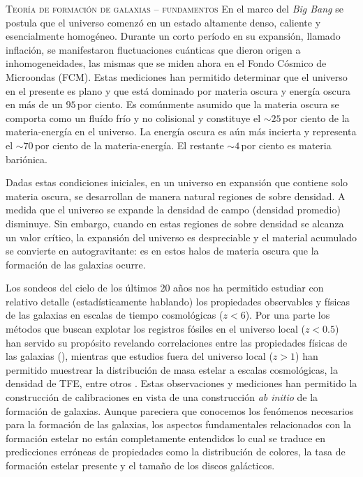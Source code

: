 \documentclass[xcolor=dvipsnames,4pt,hyperref={colorlinks,citecolor=black,linkcolor=black,urlcolor=black}]{beamer}
\begin{document}
\begin{frame}[allowframebreaks]{\textsc{Teoría de formación de galaxias -- fundamentos}}
%
En el marco del \emph{Big Bang} se postula que el universo comenzó en un estado altamente denso,
caliente y esencialmente homogéneo. Durante un corto período en su expansión, llamado inflación, se
manifestaron fluctuaciones cuánticas que dieron origen a inhomogeneidades, las mismas que se miden
ahora en el Fondo Cósmico de Microondas (FCM).
Estas mediciones han permitido determinar que el universo en el presente es plano y que está
dominado por materia oscura y energía oscura en más de un $95\,$por ciento. Es comúnmente asumido
que la materia oscura se comporta como un fluído frío y no colisional y constituye el $\sim25\,$por
ciento de la materia-energía en el universo.
La energía oscura es aún más incierta y representa el $\sim70\,$por ciento de la materia-energía. El
restante $\sim4\,$por ciento es materia bariónica.

Dadas estas condiciones iniciales, en un universo en expansión que contiene solo materia oscura, se
desarrollan de manera natural regiones de sobre densidad.
A medida que el universo se expande la densidad de campo (densidad promedio) disminuye.
Sin embargo, cuando en estas regiones de sobre densidad se alcanza un valor crítico, la expansión
del universo es despreciable y el material acumulado se convierte en autogravitante: es en estos
halos de materia oscura que la formación de las galaxias ocurre.

Los sondeos del cielo de los últimos 20 años nos ha permitido estudiar con relativo detalle
(estadísticamente hablando) los propiedades observables y físicas de las galaxias en escalas de
tiempo cosmológicas ($z<6$). Por una parte los métodos que buscan explotar los registros fósiles en
el universo local ($z<0.5$) han servido su propósito revelando correlaciones entre las propiedades
físicas de las galaxias (\cites[la relación masa-metalicidad,][]{Tremonti2004, Sanchez2013}[la
relación edad-metalicidad,][]{Worthey1994, Gallazzi2005, Panter2008}), mientras que estudios fuera
del universo local ($z>1$) han permitido muestrear la distribución de masa estelar a escalas
cosmológicas, la densidad de TFE, entre otros \citep[véase][para una revisión completa]{Madau2014}.
Estas observaciones y mediciones han permitido la construcción de calibraciones en vista de una
construcción \emph{ab initio} de la formación de galaxias. Aunque pareciera que conocemos los
fenómenos necesarios para la formación de las galaxias, los aspectos fundamentales relacionados con
la formación estelar no están completamente entendidos lo cual se traduce en predicciones erróneas
de propiedades como la distribución de colores, la tasa de formación estelar presente y el tamaño de
los discos galácticos.


\end{frame}
\end{document}
